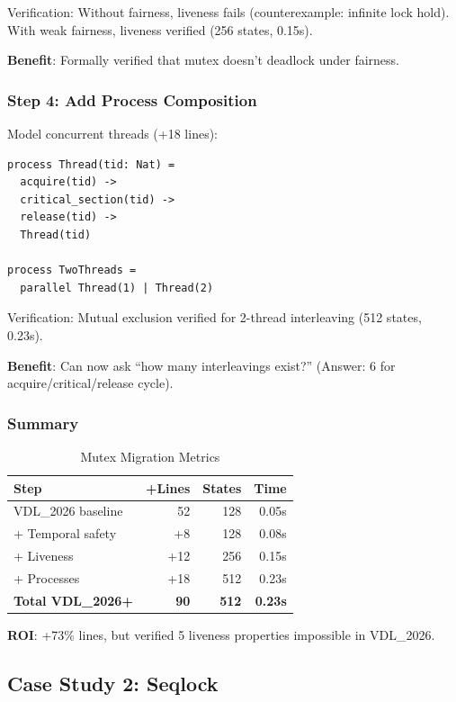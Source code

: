 \documentclass[conference]{IEEEtran}
\begin{document}
Verification: Without fairness, liveness fails (counterexample: infinite lock hold). With weak fairness, liveness verified (256 states, 0.15s).

\textbf{Benefit}: Formally verified that mutex doesn't deadlock under fairness.

\subsubsection{Step 4: Add Process Composition}

Model concurrent threads (+18 lines):

\begin{lstlisting}[caption={Step 4: Process composition}]
process Thread(tid: Nat) =
  acquire(tid) ->
  critical_section(tid) ->
  release(tid) ->
  Thread(tid)

process TwoThreads =
  parallel Thread(1) | Thread(2)
\end{lstlisting}

Verification: Mutual exclusion verified for 2-thread interleaving (512 states, 0.23s).

\textbf{Benefit}: Can now ask ``how many interleavings exist?'' (Answer: 6 for acquire/critical/release cycle).

\subsubsection{Summary}

\begin{table}[h]
\centering
\caption{Mutex Migration Metrics}
\begin{tabular}{|l|r|r|r|}
\hline
\textbf{Step} & \textbf{+Lines} & \textbf{States} & \textbf{Time} \\
\hline
VDL\_2026 baseline & 52 & 128 & 0.05s \\
+ Temporal safety & +8 & 128 & 0.08s \\
+ Liveness & +12 & 256 & 0.15s \\
+ Processes & +18 & 512 & 0.23s \\
\hline
\textbf{Total VDL\_2026+} & \textbf{90} & \textbf{512} & \textbf{0.23s} \\
\hline
\end{tabular}
\end{table}

\textbf{ROI}: +73\% lines, but verified 5 liveness properties impossible in VDL\_2026.

\subsection{Case Study 2: Seqlock}
\end{document}
